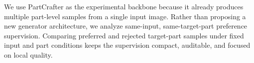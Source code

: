 \documentclass[10pt,twocolumn,letterpaper]{article}
\begin{document}
We use PartCrafter \cite{lin2025partcrafter} as the experimental backbone because it already produces multiple part-level samples from a single input image. Rather than proposing a new generator architecture, we analyze same-input, same-target-part preference supervision. Comparing preferred and rejected target-part samples under fixed input and part conditions keeps the supervision compact, auditable, and focused on local quality.
\end{document}
